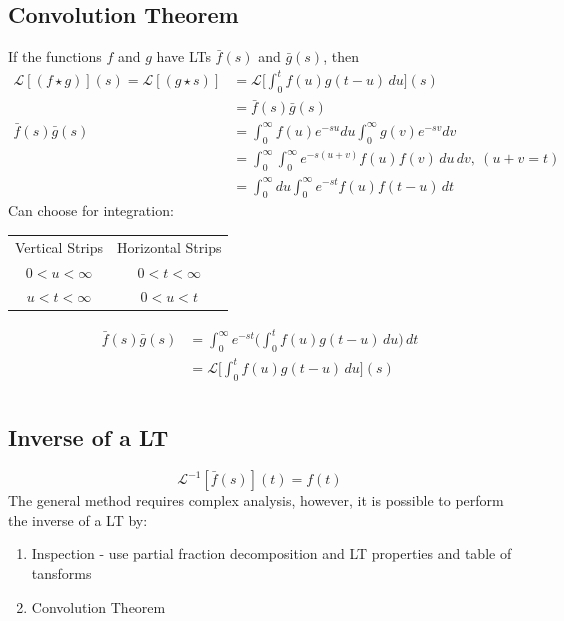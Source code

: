 \documentclass[a4paper, 11pt, normalem]{report}
\newcommand\ofnt{\int_{0}^{\infty}}
\newcommand\La{\mathcal{L}}
\begin{document}
\section{Convolution Theorem}
If the functions $f$ and $g$ have LTs $\bar{f}(s)$ and $\bar{g}(s)$, then
\begin{align*}
    \La[(f \star g)](s) = \La[(g \star s)] &= \La\Big[\int_{0}^{t} f(u)g(t - u)\,du \Big](s) \\
    &= \bar{f}(s)\bar{g}(s) \\
    \bar{f}(s)\bar{g}(s) &= \ofnt f(u)e^{-su}du \ofnt g(v)e^{-sv}dv \\
    &= \ofnt \ofnt e^{-s(u + v)}f(u)f(v)\, du\,dv,~ (u + v = t) \\
    &= \ofnt du \ofnt e^{-st}f(u)f(t - u)\,dt
\end{align*}
Can choose for integration:
\begin{tabular}{c|c}
    Vertical Strips & Horizontal Strips \\
    $0 < u < \infty$ & $0 < t < \infty$ \\
    $u < t < \infty$ & $0 < u < t$
\end{tabular}
\begin{align*}
    \bar{f}(s)\bar{g}(s) &= \ofnt e^{-st} \Bigg(\int_{0}^{t} f(u)g(t - u)\, du\Bigg)\,dt \\
    &= \La\bigg[\int_{0}^{t} f(u)g(t - u)\,du\bigg](s)
\end{align*}

\chapter{}
\section{Inverse of a LT}
\begin{equation*}
    \La^{-1}[\bar{f}(s)](t) = f(t)
\end{equation*}
The general method requires complex analysis, however, it is possible to perform the inverse of a LT by:
\begin{enumerate}
    \item Inspection - use partial fraction decomposition and LT properties and table of tansforms
    \item Convolution Theorem
\end{enumerate}
\end{document}
